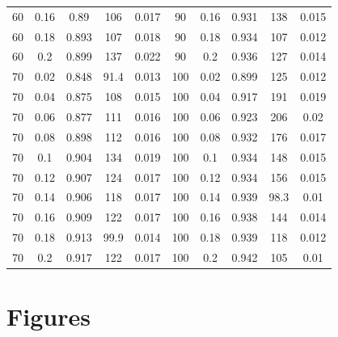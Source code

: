 \documentclass[12pt]{article}
\begin{document}
\begin{table}[h!]
\begin{tabular}{c c | c | c c ||c c | c | c c |}
			60	&	0.16	&	0.89	&	106	&	0.017	&	90	&	0.16	&	0.931	&	138	&	0.015	\\
			60	&	0.18	&	0.893	&	107	&	0.018	&	90	&	0.18	&	0.934	&	107	&	0.012	\\
			60	&	0.2	&	0.899	&	137	&	0.022	&	90	&	0.2	&	0.936	&	127	&	0.014	\\
			70	&	0.02	&	0.848	&	91.4	&	0.013	&	100	&	0.02	&	0.899	&	125	&	0.012	\\
			70	&	0.04	&	0.875	&	108	&	0.015	&	100	&	0.04	&	0.917	&	191	&	0.019	\\
			70	&	0.06	&	0.877	&	111	&	0.016	&	100	&	0.06	&	0.923	&	206	&	0.02	\\
			70	&	0.08	&	0.898	&	112	&	0.016	&	100	&	0.08	&	0.932	&	176	&	0.017	\\
			70	&	0.1	&	0.904	&	134	&	0.019	&	100	&	0.1	&	0.934	&	148	&	0.015	\\
			70	&	0.12	&	0.907	&	124	&	0.017	&	100	&	0.12	&	0.934	&	156	&	0.015	\\
			70	&	0.14	&	0.906	&	118	&	0.017	&	100	&	0.14	&	0.939	&	98.3	&	0.01	\\
			70	&	0.16	&	0.909	&	122	&	0.017	&	100	&	0.16	&	0.938	&	144	&	0.014	\\
			70	&	0.18	&	0.913	&	99.9	&	0.014	&	100	&	0.18	&	0.939	&	118	&	0.012	\\
			70	&	0.2	&	0.917	&	122	&	0.017	&	100	&	0.2	&	0.942	&	105	&	0.01	\\
			\hline
		\end{tabular}
		\end{table}


\section{Figures}

\end{document}
